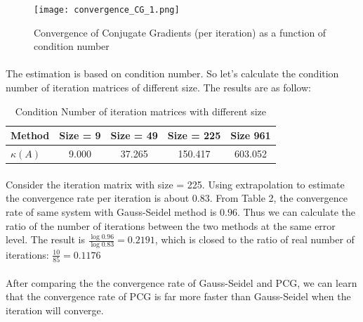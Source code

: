 \documentclass{article}
\begin{document}
\begin{figure}[h]
\centering
\texttt{[image: convergence\_CG\_1.png]}
\caption{Convergence of Conjugate Gradients (per iteration) as a function of condition number}
\label{overflow}
\end{figure}

\paragraph{}
The estimation is based on condition number. So let's calculate the condition number of iteration matrices of different size. The results are as follow:
\begin{table}[h]
\begin{center}
\begin{tabular}{lcccc}
\hline
Method & Size = 9 & Size = 49 & Size = 225 & Size 961 \\
\hline
$\kappa(A)$ & 9.000 & 37.265 & 150.417 & 603.052\\
\hline
\end{tabular}
\caption{Condition Number of iteration matrices with different size}
\end{center}
\end{table}

\paragraph{}
Consider the iteration matrix with size = 225. Using extrapolation to estimate the convergence rate per iteration is about $0.83$. From Table 2, the convergence rate of same system with Gauss-Seidel method is $0.96$. Thus we can calculate the ratio of the number of iterations between the two methods at the same error level. The result is $\frac{\log0.96}{\log0.83} = 0.2191$, which is closed to the ratio of real number of iterations: $\frac{10}{85} = 0.1176$

\paragraph{}
After comparing the the convergence rate of Gauss-Seidel and PCG, we can learn that the convergence rate of PCG is far more faster than Gauss-Seidel when the iteration will converge.
\end{document}
